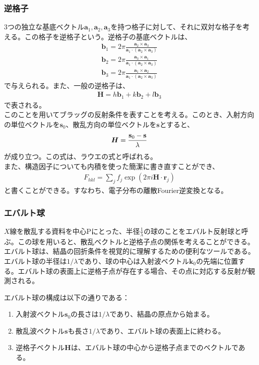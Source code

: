 \documentclass[a4paper,11pt]{jsarticle}
\begin{document}
\subsubsection{逆格子}
3つの独立な基底ベクトル$\bm{a}_1,\bm{a}_2,\bm{a}_3$を持つ格子に対して、それに双対な格子を考える。この格子を逆格子という。逆格子の基底ベクトルは、
\begin{align}
  \bm{b}_1 = 2\pi\frac{\bm{a}_2\times\bm{a}_3}{\bm{a}_1\cdot(\bm{a}_2\times\bm{a}_3)} \\
  \bm{b}_2 = 2\pi\frac{\bm{a}_3\times\bm{a}_1}{\bm{a}_1\cdot(\bm{a}_2\times\bm{a}_3)} \\
  \bm{b}_3 = 2\pi\frac{\bm{a}_1\times\bm{a}_2}{\bm{a}_1\cdot(\bm{a}_2\times\bm{a}_3)}
\end{align}
で与えられる。また、一般の逆格子は、
\begin{align}
  \bm{H} = h\bm{b}_1 + k\bm{b}_2 + l\bm{b}_3
\end{align}
で表される。\\
このことを用いてブラッグの反射条件を表すことを考える。このとき、入射方向の単位ベクトルを$\bm{s}_0$、散乱方向の単位ベクトルを$\bm{s}$とすると、
\begin{align}
  \bm{H} = \frac{\vb{s}_0 - \vb{s}}{\lambda} \label{eq:bragg}
\end{align}
が成り立つ。この式は、ラウエの式と呼ばれる。\\
また、構造因子についても内積を使った簡潔に書き直すことができ、
\begin{align}
  F_{hkl} = \sum_{j}f_j\exp(2\pi i\bm{H}\cdot\bm{r}_j)
\end{align}
と書くことができる。すなわち、電子分布の離散Fourier逆変換となる。

\subsubsection{エバルト球}
$X$線を散乱する資料を中心Pにとった、半径$\frac{1}{\lambda}$の球のことをエバルト反射球と呼ぶ。この球を用いると、散乱ベクトルと逆格子点の関係を考えることができる。
エバルト球は、結晶の回折条件を視覚的に理解するための便利なツールである。エバルト球の半径は$1/\lambda$であり、球の中心は入射波ベクトル$\bm{k}_0$の先端に位置する。エバルト球の表面上に逆格子点が存在する場合、その点に対応する反射が観測される。

エバルト球の構成は以下の通りである：
\begin{enumerate}
  \item 入射波ベクトル$\bm{s}_0$の長さは$1/\lambda$であり、結晶の原点から始まる。
  \item 散乱波ベクトル$\bm{s}$も長さ$1/\lambda$であり、エバルト球の表面上に終わる。
  \item 逆格子ベクトル$\bm{H}$は、エバルト球の中心から逆格子点までのベクトルである。
\end{enumerate}
\end{document}
